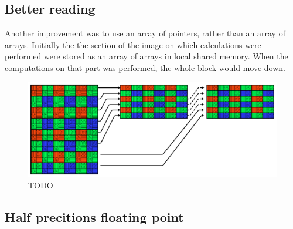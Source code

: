 \subsection{Better reading}
Another improvement was to use an array of pointers, rather than an array of arrays.
Initially the the section of the image on which calculations were performed were stored as an array of arrays in local shared memory.
When the computations on that part was performed, the whole block would move down.
\begin{figure}[H]
    \centering
    \includegraphics[width=\textwidth]{figures/polarized_image/read_line.pdf}
    \caption{TODO}
\end{figure}


\subsection{Half precitions floating point}